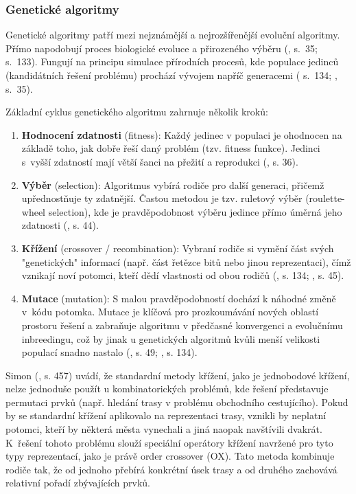 \documentclass[a4paper, twoside, 12pt, czech]{article}
\begin{document}
\subsubsection{Genetické algoritmy}
Genetické algoritmy patří mezi nejznámější a nejrozšířenější evoluční algoritmy. 
Přímo napodobují proces biologické evoluce a přirozeného výběru (\cite{evolutionaryOptimizationAlgos}, s.~35; \cite{aiModernApproach} s.~133). 
Fungují na principu simulace přírodních procesů, kde populace jedinců (kandidátních 
řešení problému) prochází vývojem napříč generacemi (\cite{aiModernApproach} s.~134; \cite{evolutionaryOptimizationAlgos}, s.~35).

Základní cyklus genetického algoritmu zahrnuje několik kroků:
\begin{enumerate}
    \item \textbf{Hodnocení zdatnosti} (fitness): Každý jedinec v populaci je ohodnocen na základě toho, jak dobře řeší daný problém (tzv. fitness funkce). Jedinci s~vyšší zdatností mají větší šanci na přežití a reprodukci (\cite{evolutionaryOptimizationAlgos}, s. 36).
    \item \textbf{Výběr} (selection): Algoritmus vybírá rodiče pro další generaci, přičemž upřednostňuje ty zdatnější. Častou metodou je tzv. ruletový výběr (roulette-wheel selection), kde je pravděpodobnost výběru jedince přímo úměrná jeho zdatnosti (\cite{evolutionaryOptimizationAlgos}, s. 44).
    \item \textbf{Křížení} (crossover / recombination): Vybraní rodiče si vymění část svých "genetických" informací (např. část řetězce bitů nebo jinou reprezentaci), čímž vznikají noví potomci, kteří dědí vlastnosti od obou rodičů (\cite{aiModernApproach}, s. 134; \cite{evolutionaryOptimizationAlgos}, s. 45).
    \item \textbf{Mutace} (mutation): S malou pravděpodobností dochází k náhodné změně v~kódu potomka. Mutace je klíčová pro prozkoumávání nových oblastí prostoru řešení a zabraňuje algoritmu v předčasné konvergenci a evolučnímu inbreedingu, což by jinak u genetických algoritmů kvůli menší velikosti populací snadno nastalo (\cite{evolutionaryOptimizationAlgos}, s. 49; \cite{aiModernApproach}, s. 134). 
\end{enumerate}

Simon (\cite{evolutionaryOptimizationAlgos}, s. 457) uvádí, že standardní metody 
křížení, jako je jednobodové křížení, nelze jednoduše použít 
u kombinatorických problémů, kde řešení předsta\-vuje permutaci prvků (např. hledání 
trasy v problému obchodního cestujícího). Pokud by se standardní křížení 
aplikovalo na reprezentaci trasy, vznikli by neplatní potomci, kteří by některá 
města vynechali a jiná naopak navštívili dvakrát.
K~řešení tohoto problému slouží speciální operátory křížení navržené pro tyto 
typy reprezentací, jako je právě order crossover (OX). Tato metoda kombinuje rodiče 
tak, že od jednoho přebírá konkrétní úsek trasy a od druhého zachovává relativní pořadí 
zbývajících prvků.
\end{document}
